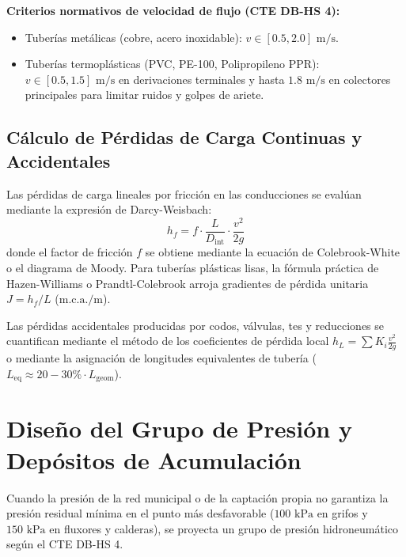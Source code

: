 \documentclass{report}
\begin{document}
\textbf{Criterios normativos de velocidad de flujo (CTE DB-HS 4):}
\begin{itemize}
    \item Tuberías metálicas (cobre, acero inoxidable): $v \in [0.5, 2.0]\text{ m/s}$.
    \item Tuberías termoplásticas (PVC, PE-100, Polipropileno PPR): $v \in [0.5, 1.5]\text{ m/s}$ en derivaciones terminales y hasta $1.8\text{ m/s}$ en colectores principales para limitar ruidos y golpes de ariete.
\end{itemize}

\subsection{Cálculo de Pérdidas de Carga Continuas y Accidentales}
Las pérdidas de carga lineales por fricción en las conducciones se evalúan mediante la expresión de Darcy-Weisbach:
\begin{equation}
    h_f = f \cdot \frac{L}{D_{\text{int}}} \cdot \frac{v^2}{2g}
\end{equation}
donde el factor de fricción $f$ se obtiene mediante la ecuación de Colebrook-White o el diagrama de Moody. Para tuberías plásticas lisas, la fórmula práctica de Hazen-Williams o Prandtl-Colebrook arroja gradientes de pérdida unitaria $J = h_f / L$ ($\text{m.c.a./m}$).

Las pérdidas accidentales producidas por codos, válvulas, tes y reducciones se cuantifican mediante el método de los coeficientes de pérdida local $h_L = \sum K_i \frac{v^2}{2g}$ o mediante la asignación de longitudes equivalentes de tubería ($L_{\text{eq}} \approx 20-30\% \cdot L_{\text{geom}}$).

\section{Diseño del Grupo de Presión y Depósitos de Acumulación}
Cuando la presión de la red municipal o de la captación propia no garantiza la presión residual mínima en el punto más desfavorable ($100\text{ kPa}$ en grifos y $150\text{ kPa}$ en fluxores y calderas), se proyecta un grupo de presión hidroneumático según el CTE DB-HS 4.
\end{document}
